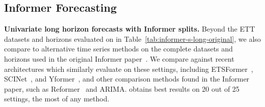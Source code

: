 \subsection{Informer Forecasting}\label{appendix:informer_extended}

\textbf{Univariate long horizon forecasts with Informer splits.} Beyond the ETT datasets and horizons evaluated on in Table~\ref{tab:informer-s-long-original}, we also compare \ourmethod{} to alternative time series methods on the complete datasets and horizons used in the original Informer paper~\citep{zhou2021informer}. We compare against recent architectures which similarly evaluate on these settings, including ETSFormer~\citep{woo2022etsformer}, SCINet~\citep{liu2021time}, and Yformer~\citep{madhusudhanan2021yformer}, and other comparison methods found in the Informer paper, such as Reformer~\citep{kitaev2020reformer} and ARIMA.
\ourmethod{} obtains best results on 20 out of 25 settings, the most of any method.

